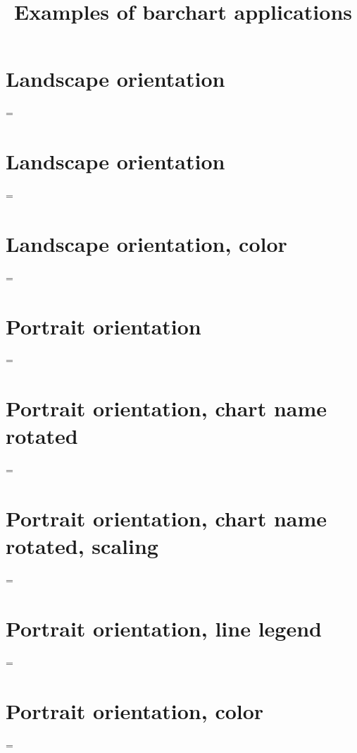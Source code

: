 \documentclass[10pt]{article}
\begin{document}
\title{Examples of barchart applications}
\maketitle

\section{Landscape orientation}

\epsfxsize=\linewidth
{}

\section{Landscape orientation}

\epsfxsize=\linewidth
{}

\section{Landscape orientation, color}

\epsfxsize=\linewidth
{}

\section{Portrait orientation}

\epsfxsize=\linewidth
{}

\section{Portrait orientation, chart name rotated}

\epsfxsize=\linewidth
{}

\section{Portrait orientation, chart name rotated, scaling}

\epsfxsize=\linewidth
{}

\section{Portrait orientation, line legend}

\epsfxsize=\linewidth
{}

\section{Portrait orientation, color}

\epsfxsize=\linewidth
{}
\end{document}
